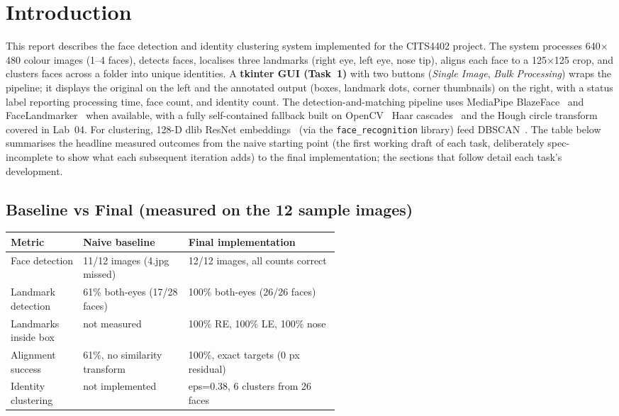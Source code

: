 \section{Introduction}
This report describes the face detection and identity clustering system implemented
for the CITS4402 project. The system processes 640$\times$480 colour images (1--4 faces),
detects faces, localises three landmarks (right eye, left eye, nose tip), aligns
each face to a 125$\times$125 crop, and clusters faces across a folder into unique
identities. A \textbf{tkinter GUI (Task~1)} with two buttons (\emph{Single Image},
\emph{Bulk Processing}) wraps the pipeline; it displays the original on the left
and the annotated output (boxes, landmark dots, corner thumbnails) on the right,
with a status label reporting processing time, face count, and identity count.
The detection-and-matching pipeline uses MediaPipe BlazeFace~\citep{bazarevsky2019blazeface}
and FaceLandmarker~\citep{lugaresi2019mediapipe} when available, with a
fully self-contained fallback built on OpenCV~\citep{bradski2000opencv} Haar
cascades~\citep{viola2001rapid} and the Hough circle transform~\citep{yuen1990hough}
covered in Lab~04. For clustering, 128-D dlib ResNet embeddings~\citep{king2009dlib}
(via the \texttt{face\_recognition} library) feed DBSCAN~\citep{ester1996density}.
The table below summarises the headline measured outcomes from the naive starting
point (the first working draft of each task, deliberately spec-incomplete to
show what each subsequent iteration adds) to the final implementation; the
sections that follow detail each task's development.

\subsection{Baseline vs Final (measured on the 12 sample images)}
\noindent
\begin{tabularx}{\linewidth}{@{}p{0.22\linewidth} p{0.32\linewidth} X@{}}
\toprule
\textbf{Metric} & \textbf{Naive baseline} & \textbf{Final implementation} \\
\midrule
Face detection         & 11/12 images (4.jpg missed)   & 12/12 images, all counts correct \\
Landmark detection     & 61\% both-eyes (17/28 faces)  & 100\% both-eyes (26/26 faces) \\
Landmarks inside box   & not measured                  & 100\% RE, 100\% LE, 100\% nose \\
Alignment success      & 61\%, no similarity transform & 100\%, exact targets (0 px residual) \\
Identity clustering    & not implemented               & eps=0.38, 6 clusters from 26 faces \\
\bottomrule
\end{tabularx}

